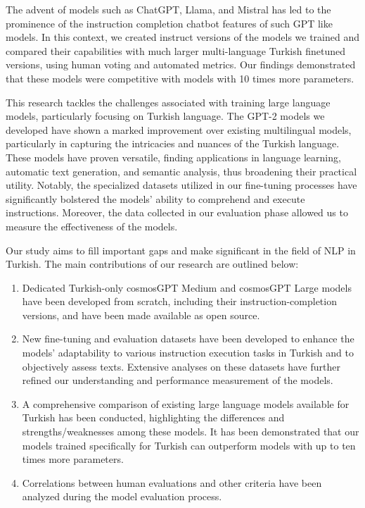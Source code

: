 \documentclass[conference]{IEEEtran}
\begin{document}
The advent of models such as ChatGPT\cite{achiam2023gpt}, Llama\cite{touvron2023llama}, and Mistral \cite{jiang2023mistral} has led to the prominence of the instruction completion chatbot features of such GPT like models. 
In this context, we created instruct versions of the models we trained and compared their capabilities with much larger multi-language Turkish finetuned versions, using human voting and automated metrics. 
Our findings demonstrated that these models were competitive with models with 10 times more parameters.

This research tackles the challenges associated with training large language models, particularly focusing on Turkish language. 
The GPT-2 models we developed have shown a marked improvement over existing multilingual models, particularly in capturing the intricacies and nuances of the Turkish language. 
These models have proven versatile, finding applications in language learning, automatic text generation, and semantic analysis, thus broadening their practical utility. 
Notably, the specialized datasets utilized in our fine-tuning processes have significantly bolstered the models’ ability to comprehend and execute instructions. 
Moreover, the data collected in our evaluation phase allowed us to measure the effectiveness of the models.

Our study aims to fill important gaps and make significant in the field of NLP in Turkish. The main contributions of our research are outlined below:
\begin{enumerate}
        \item Dedicated Turkish-only cosmosGPT Medium and cosmosGPT Large models have been developed from scratch, including their instruction-completion versions, and have been made available as open source.
        \item New fine-tuning and evaluation datasets have been developed to enhance the models' adaptability to various instruction execution tasks in Turkish and to objectively assess texts. Extensive analyses on these datasets have further refined our understanding and performance measurement of the models.
        \item A comprehensive comparison of existing large language models available for Turkish has been conducted, highlighting the differences and strengths/weaknesses among these models. It has been demonstrated that our models trained specifically for Turkish can outperform models with up to ten times more parameters.
        \item Correlations between human evaluations and other criteria have been analyzed during the model evaluation process.
\end{enumerate}
\end{document}
